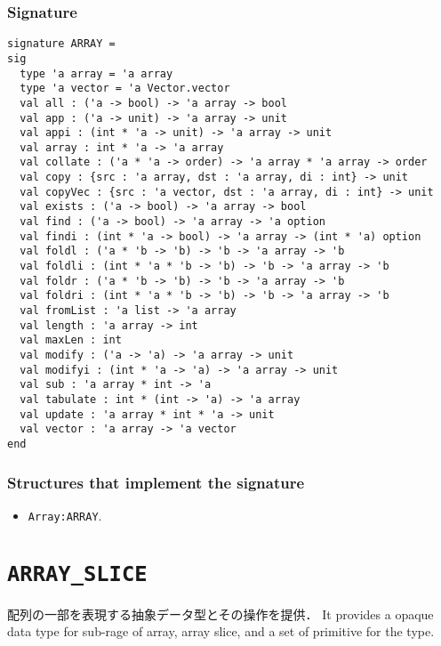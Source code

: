 \documentclass{jbook}
\newcommand{\txt}[2]{#2}
\newcommand{\code}[1]{\mbox{\large\tt #1}}
\newcommand{\signature}[2]{
\section{{\tt #1}}\label{section:reference:#2}
}
\newcommand{\Structure}{\subsubsection*{\txt{シグネチャを実装するストラクチャ}{Structures that implement the signature}}}
\newcommand{\Signature}{\subsubsection*{\txt{シグネチャ}{Signature}}}
\begin{document}
\Signature
\begin{verbatim}
signature ARRAY =
sig
  type 'a array = 'a array
  type 'a vector = 'a Vector.vector
  val all : ('a -> bool) -> 'a array -> bool
  val app : ('a -> unit) -> 'a array -> unit
  val appi : (int * 'a -> unit) -> 'a array -> unit
  val array : int * 'a -> 'a array
  val collate : ('a * 'a -> order) -> 'a array * 'a array -> order
  val copy : {src : 'a array, dst : 'a array, di : int} -> unit
  val copyVec : {src : 'a vector, dst : 'a array, di : int} -> unit
  val exists : ('a -> bool) -> 'a array -> bool
  val find : ('a -> bool) -> 'a array -> 'a option
  val findi : (int * 'a -> bool) -> 'a array -> (int * 'a) option
  val foldl : ('a * 'b -> 'b) -> 'b -> 'a array -> 'b
  val foldli : (int * 'a * 'b -> 'b) -> 'b -> 'a array -> 'b
  val foldr : ('a * 'b -> 'b) -> 'b -> 'a array -> 'b
  val foldri : (int * 'a * 'b -> 'b) -> 'b -> 'a array -> 'b
  val fromList : 'a list -> 'a array
  val length : 'a array -> int
  val maxLen : int
  val modify : ('a -> 'a) -> 'a array -> unit
  val modifyi : (int * 'a -> 'a) -> 'a array -> unit
  val sub : 'a array * int -> 'a
  val tabulate : int * (int -> 'a) -> 'a array
  val update : 'a array * int * 'a -> unit
  val vector : 'a array -> 'a vector
end
\end{verbatim}

\Structure
\begin{itemize}
\item \code{Array:ARRAY}. 
\end{itemize}

\signature{ARRAY\_SLICE}{ARRAYSLICE}
\ifjp%
	配列の一部を表現する抽象データ型とその操作を提供．
\else%
	It provides a opaque data type for sub-rage of array, array
slice, and a set of primitive for the type.
\fi%
\end{document}
